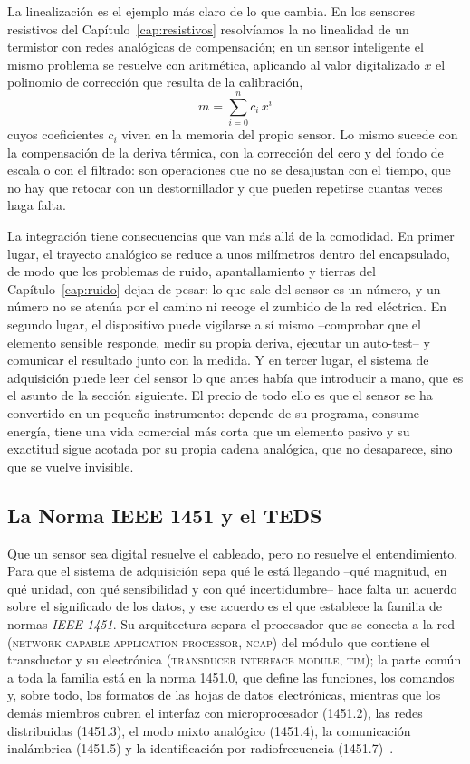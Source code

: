 La linealización es el ejemplo más claro de lo que cambia. En los sensores resistivos del Capítulo~\ref{cap:resistivos} resolvíamos la no linealidad de un termistor con redes analógicas de compensación; en un sensor inteligente el mismo problema se resuelve con aritmética, aplicando al valor digitalizado $x$ el polinomio de corrección que resulta de la calibración,
\begin{equation}\label{eq:linealizacion_digital}
    m = \sum_{i=0}^{n} c_i\,x^i
\end{equation}
cuyos coeficientes $c_i$ viven en la memoria del propio sensor. Lo mismo sucede con la compensación de la deriva térmica, con la corrección del cero y del fondo de escala o con el filtrado: son operaciones que no se desajustan con el tiempo, que no hay que retocar con un destornillador y que pueden repetirse cuantas veces haga falta.

La integración tiene consecuencias que van más allá de la comodidad. En primer lugar, el trayecto analógico se reduce a unos milímetros dentro del encapsulado, de modo que los problemas de ruido, apantallamiento y tierras del Capítulo~\ref{cap:ruido} dejan de pesar: lo que sale del sensor es un número, y un número no se atenúa por el camino ni recoge el zumbido de la red eléctrica. En segundo lugar, el dispositivo puede vigilarse a sí mismo --comprobar que el elemento sensible responde, medir su propia deriva, ejecutar un auto-test-- y comunicar el resultado junto con la medida. Y en tercer lugar, el sistema de adquisición puede leer del sensor lo que antes había que introducir a mano, que es el asunto de la sección siguiente. El precio de todo ello es que el sensor se ha convertido en un pequeño instrumento: depende de su programa, consume energía, tiene una vida comercial más corta que un elemento pasivo y su exactitud sigue acotada por su propia cadena analógica, que no desaparece, sino que se vuelve invisible.

\subsection{La Norma IEEE 1451 y el TEDS}\label{sub:teds}

Que un sensor sea digital resuelve el cableado, pero no resuelve el entendimiento. Para que el sistema de adquisición sepa qué le está llegando --qué magnitud, en qué unidad, con qué sensibilidad y con qué incertidumbre-- hace falta un acuerdo sobre el significado de los datos, y ese acuerdo es el que establece la familia de normas \emph{IEEE 1451}. Su arquitectura separa el procesador que se conecta a la red (\textsc{network capable application processor, ncap}) del módulo que contiene el transductor y su electrónica (\textsc{transducer interface module, tim}); la parte común a toda la familia está en la norma 1451.0, que define las funciones, los comandos y, sobre todo, los formatos de las hojas de datos electrónicas, mientras que los demás miembros cubren el interfaz con microprocesador (1451.2), las redes distribuidas (1451.3), el modo mixto analógico (1451.4), la comunicación inalámbrica (1451.5) y la identificación por radiofrecuencia (1451.7)~\cite{ieee1451_0_2007}.

